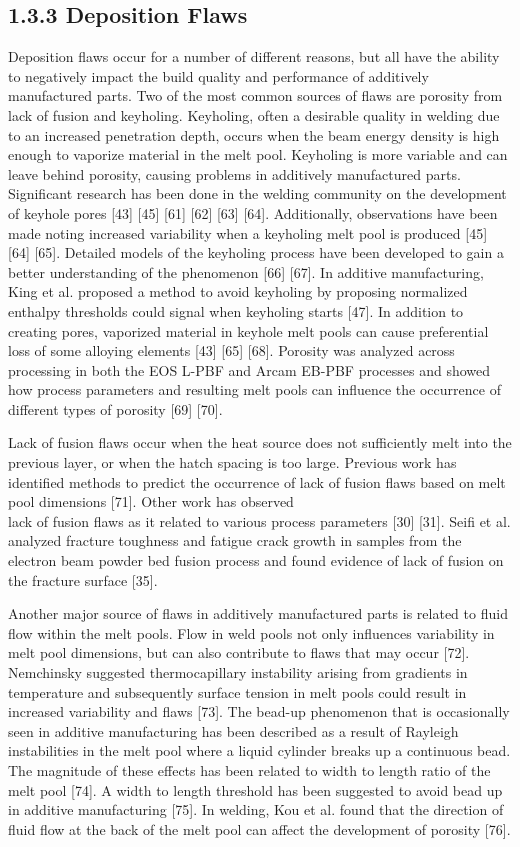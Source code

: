 \documentclass[10pt]{article}
\begin{document}
\subsection*{1.3.3 Deposition Flaws}
Deposition flaws occur for a number of different reasons, but all have the ability to negatively impact the build quality and performance of additively manufactured parts. Two of the most common sources of flaws are porosity from lack of fusion and keyholing. Keyholing, often a desirable quality in welding due to an increased penetration depth, occurs when the beam energy density is high enough to vaporize material in the melt pool. Keyholing is more variable and can leave behind porosity, causing problems in additively manufactured parts. Significant research has been done in the welding community on the development of keyhole pores [43] [45] [61] [62] [63] [64]. Additionally, observations have been made noting increased variability when a keyholing melt pool is produced [45] [64] [65]. Detailed models of the keyholing process have been developed to gain a better understanding of the phenomenon [66] [67]. In additive manufacturing, King et al. proposed a method to avoid keyholing by proposing normalized enthalpy thresholds could signal when keyholing starts [47]. In addition to creating pores, vaporized material in keyhole melt pools can cause preferential loss of some alloying elements [43] [65] [68]. Porosity was analyzed across processing in both the EOS L-PBF and Arcam EB-PBF processes and showed how process parameters and resulting melt pools can influence the occurrence of different types of porosity [69] [70].

Lack of fusion flaws occur when the heat source does not sufficiently melt into the previous layer, or when the hatch spacing is too large. Previous work has identified methods to predict the occurrence of lack of fusion flaws based on melt pool dimensions [71]. Other work has observed\\
lack of fusion flaws as it related to various process parameters [30] [31]. Seifi et al. analyzed fracture toughness and fatigue crack growth in samples from the electron beam powder bed fusion process and found evidence of lack of fusion on the fracture surface [35].

Another major source of flaws in additively manufactured parts is related to fluid flow within the melt pools. Flow in weld pools not only influences variability in melt pool dimensions, but can also contribute to flaws that may occur [72]. Nemchinsky suggested thermocapillary instability arising from gradients in temperature and subsequently surface tension in melt pools could result in increased variability and flaws [73]. The bead-up phenomenon that is occasionally seen in additive manufacturing has been described as a result of Rayleigh instabilities in the melt pool where a liquid cylinder breaks up a continuous bead. The magnitude of these effects has been related to width to length ratio of the melt pool [74]. A width to length threshold has been suggested to avoid bead up in additive manufacturing [75]. In welding, Kou et al. found that the direction of fluid flow at the back of the melt pool can affect the development of porosity [76].
\end{document}
